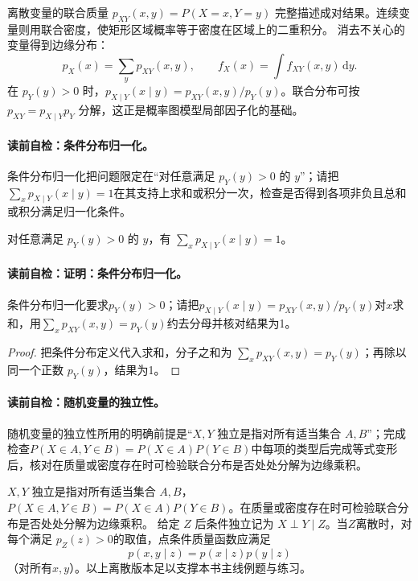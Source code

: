 离散变量的联合质量 $p_{XY}(x,y)=P(X=x,Y=y)$ 完整描述成对结果。连续变量则用联合密度，使矩形区域概率等于密度在区域上的二重积分。
消去不关心的变量得到边缘分布：
\[
p_X(x)=\sum_y p_{XY}(x,y),\qquad f_X(x)=\int f_{XY}(x,y)\,\mathrm dy.
\]
在 $p_Y(y)>0$ 时，$p_{X\mid Y}(x\mid y)=p_{XY}(x,y)/p_Y(y)$。联合分布可按 $p_{XY}=p_{X\mid Y}p_Y$ 分解，这正是概率图模型局部因子化的基础。

\label{struct:V1-C04-CH13}
\paragraph{读前自检：条件分布归一化。}条件分布归一化把问题限定在“对任意满足 $p_Y(y)>0$ 的 $y$”；请把$\sum_xp_{X\mid Y}(x\mid y)=1$在其支持上求和或积分一次，检查是否得到各项非负且总和或积分满足归一化条件。\par

\begin{lemma}[条件分布归一化]
对任意满足 $p_Y(y)>0$ 的 $y$，有 $\sum_xp_{X\mid Y}(x\mid y)=1$。
\end{lemma}
\paragraph{读前自检：证明：条件分布归一化。}条件分布归一化要求$p_Y(y)>0$；请把$p_{X\mid Y}(x\mid y)=p_{XY}(x,y)/p_Y(y)$对$x$求和，用$\sum_xp_{XY}(x,y)=p_Y(y)$约去分母并核对结果为1。\par

\begin{proof}
把条件分布定义代入求和，分子之和为 $\sum_xp_{XY}(x,y)=p_Y(y)$；再除以同一个正数 $p_Y(y)$，结果为1。
\end{proof}


\paragraph{读前自检：随机变量的独立性。}随机变量的独立性所用的明确前提是“$X,Y$ 独立是指对所有适当集合 $A,B$”；完成检查$P(X\in A,Y\in B)=P(X\in A)P(Y\in B)$中每项的类型后完成等式变形后，核对在质量或密度存在时可检验联合分布是否处处分解为边缘乘积。\par

$X,Y$ 独立是指对所有适当集合 $A,B$，$P(X\in A,Y\in B)=P(X\in A)P(Y\in B)$。在质量或密度存在时可检验联合分布是否处处分解为边缘乘积。
给定 $Z$ 后条件独立记为 $X\perp Y\mid Z$。当$Z$离散时，对每个满足
$p_Z(z)>0$的取值，点条件质量函数应满足
\[
p(x,y\mid z)=p(x\mid z)p(y\mid z)
\]
（对所有$x,y$）。以上离散版本足以支撑本书主线例题与练习。

